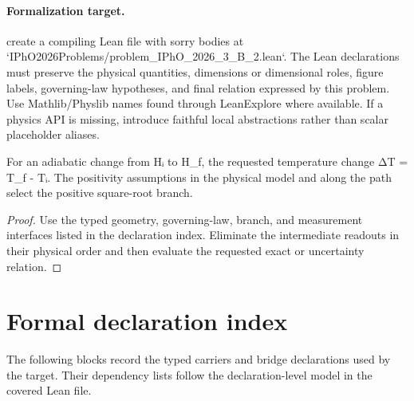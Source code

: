 \paragraph{Formalization target.}
create a compiling Lean file with sorry bodies at `IPhO2026Problems/problem\_IPhO\_2026\_3\_B\_2.lean`. The Lean declarations must preserve the physical quantities, dimensions or dimensional roles, figure labels, governing-law hypotheses, and final relation expressed by this problem.
Use Mathlib/Physlib names found through LeanExplore where available. If a physics API is missing, introduce faithful local abstractions rather than scalar placeholder aliases.

\begin{theorem}
  \label{thm:physics:IPhO_2026_3_B_2:target}
  For an adiabatic change from Hᵢ to H\_f, the requested temperature change ΔT = T\_f - Tᵢ. The positivity assumptions in the physical model and along the path select the positive square-root branch.
\end{theorem}
\begin{proof}
  Use the typed geometry, governing-law, branch, and measurement interfaces listed in the declaration index.  Eliminate the intermediate readouts in their physical order and then evaluate the requested exact or uncertainty relation.
\end{proof}
\section*{Formal declaration index}
The following blocks record the typed carriers and bridge declarations used by the target.  Their dependency lists follow the declaration-level model in the covered Lean file.

